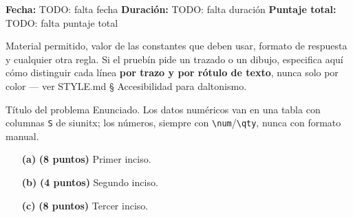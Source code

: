 \documentclass[11pt]{scrartcl}
\begin{document}
\icvmaketitle

\vspace{-6pt}
\begin{center}\small
  \textbf{Fecha:} TODO: falta fecha \;\textbullet\;
  \textbf{Duración:} TODO: falta duración \;\textbullet\;
  \textbf{Puntaje total:} TODO: falta puntaje total
\end{center}

\vspace{-4pt}

\begin{icvnote}[Instrucciones]
Material permitido, valor de las constantes que deben usar, formato de
respuesta y cualquier otra regla. Si el pruebín pide un trazado o un
dibujo, especifica aquí cómo distinguir cada línea \textbf{por trazo y por
rótulo de texto}, nunca solo por color --- ver STYLE.md § Accesibilidad
para daltonismo.
\end{icvnote}

\begin{icvproblem}[points=20]{Título del problema}
Enunciado. Los datos numéricos van en una tabla con columnas \texttt{S} de
siunitx; los números, siempre con \verb|\num|/\verb|\qty|, nunca con formato
manual.

\begin{enumerate}
  \item[\textbf{(a)}] \textbf{(8 puntos)} Primer inciso.
  \item[\textbf{(b)}] \textbf{(4 puntos)} Segundo inciso.
  \item[\textbf{(c)}] \textbf{(8 puntos)} Tercer inciso.
\end{enumerate}
\end{icvproblem}


\iftoggle{icvclave}{%
\newpage
\begin{icvnote}[Clave de respuestas]
Desarrollo y resultados numéricos de cada inciso.
\end{icvnote}
}{}
\end{document}
